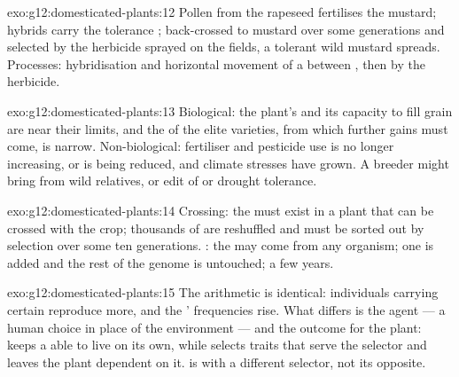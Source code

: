 \begin{solution}{exo:g12:domesticated-plants:12}
Pollen from the rapeseed fertilises the mustard; hybrids carry the
tolerance ; back-crossed to mustard over some generations and
selected by the herbicide sprayed on the fields, a tolerant wild
mustard spreads. Processes: hybridisation and horizontal movement of
a  between , then  by the herbicide.
\end{solution}

\begin{solution}{exo:g12:domesticated-plants:13}
Biological: the plant's  and its capacity to fill grain
are near their limits, and the  of the elite
varieties, from which further gains must come, is narrow.
Non-biological: fertiliser and pesticide use is no longer increasing, or
is being reduced, and climate stresses have grown. A breeder might
bring  from wild relatives, or edit  of  or
drought tolerance.
\end{solution}

\begin{solution}{exo:g12:domesticated-plants:14}
Crossing: the  must exist in a plant that can be crossed with
the crop; thousands of  are reshuffled and must be sorted out by
selection over some ten generations. : the  may come
from any organism; one  is added and the rest of the genome is
untouched; a few years.
\end{solution}

\begin{solution}{exo:g12:domesticated-plants:15}
The arithmetic is identical: individuals carrying certain 
reproduce more, and the ' frequencies rise. What differs is the
agent --- a human choice in place of the environment --- and the
outcome for the plant:  keeps a  able to live
on its own, while  selects traits that serve the selector
and leaves the plant dependent on it.  is  with a different selector, not its opposite.
\end{solution}

